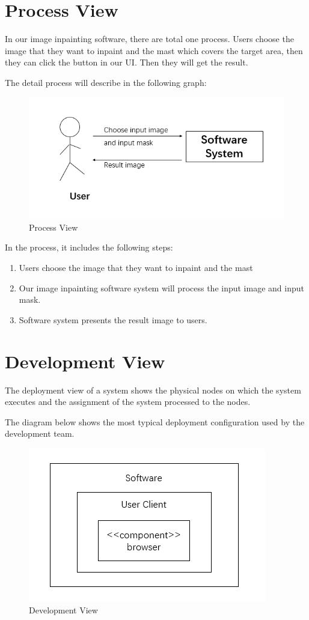 \documentclass[12pt]{article}
\begin{document}
\section{Process View}
\qquad In our image inpainting software, there are total one process. Users choose the image that they want to inpaint and the mast which covers the target area, then they can click the button in our UI. Then they will get the result. 

The detail process will describe in the following graph:
\begin{figure}[H]
	\centering
	\includegraphics[width=1.0\linewidth]{process.jpg}
	\caption{Process View}
\end{figure}

In the process, it includes the following steps:
\begin{enumerate}
	\item Users choose the image that they want to inpaint and the mast
	\item Our image inpainting software system will process the input image and input mask.
	\item Software system presents the result image to users. 
\end{enumerate}

\section{Development View}
\qquad The deployment view of a system shows the physical nodes on which the system executes and the assignment of the system processed to the nodes. 

The diagram below shows the most typical deployment configuration used by the development team.
\begin{figure}[H]
	\centering
	\includegraphics[width=0.8\linewidth]{develop.jpg}
	\caption{Development View}
\end{figure}
\end{document}
